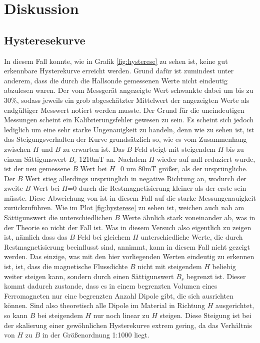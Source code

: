 \section{Diskussion}
\label{sec:Diskussion}

\subsection{Hysteresekurve}
    In diesem Fall konnte, wie in Grafik \ref{fig:hysterese} zu 
    sehen ist, keine gut erkennbare Hysterekurve erreicht werden. 
    Grund dafür ist zumindest unter anderem, dass die durch die Hallsonde
    gemessenen Werte nicht eindeutig abzulesen waren. Der vom Messgerät angezeigte
    Wert schwankte dabei um bis zu 30\%, sodass jeweils ein grob abgeschätzter 
    Mittelwert der angezeigten Werte als endgültiger Messwert notiert werden musste.
    Der Grund für die uneindeutigen Messungen scheint ein Kalibrierungsfehler gewesen zu sein.
    Es scheint sich jedoch lediglich um eine sehr starke Ungenauigkeit zu handeln, denn wie 
    zu sehen ist, ist das Steigungsverhalten der Kurve grundsätzlich so, wie es vom Zusammenhang 
    zwischen $H$ und $B$ zu erwarten ist. Das $B$ Feld steigt mit steigendem $H$
    bis zu einem Sättigunswert $B_s$ \approx $1210\si{\milli\tesla}$ an. Nachdem $H$ wieder
    auf null reduziert wurde, ist der neu gemessene $B$ Wert bei $H$=0 um 80\si{\milli\tesla} 
    größer, als der ursprüngliche. Der $B$ Wert stieg allerdings ursprünglich in negative Richtung an,
    wodurch der zweite $B$ Wert bei $H$=0 durch die Restmagnetisierung kleiner als der erste sein müsste.
    Diese Abweichung von ist in diesem Fall auf die starke Messungenauigkeit zurückzuführen. Wie im Plot \ref{fig:hysterese} zu sehen ist,
    weichen auch nah am Sättigunswert die unterschiedlichen $B$ Werte ähnlich stark voneinander ab, was in der Theorie
    so nicht der Fall ist. Was in diesem Versuch also eigentlich zu zeigen ist, nämlich dass das $B$ Feld bei gleichem
    $H$ unterschiedliche Werte, die durch Restmagnetisierung beeinflusst sind, annimmt, kann in diesem Fall nicht gezeigt
    werden. Das einzige, was mit den hier vorliegenden Werten eindeutig zu erkennen ist, ist, dass die magnetische 
    Flussdichte $B$ nicht mit steigendem $H$ beliebig weiter steigen kann, sondern durch einen Sättigunswert $B_s$
    begrenzt ist. Dieser kommt dadurch zustande, dass es in einem begrenzten Volumen eines Ferromagneten nur eine begrenzten
    Anzahl Dipole gibt, die sich ausrichten können. Sind also theoretisch alle Dipole im Material in Richtung $H$
    ausgerichtet, so kann $B$ bei steigendem $H$ nur noch linear zu $H$ steigen. Diese Steigung ist
    bei der skalierung einer gewöhnlichen Hysterekurve extrem gering, da das Verhältnis von $H$ zu $B$ in der 
    Größenordnung 1:1000 liegt. %

